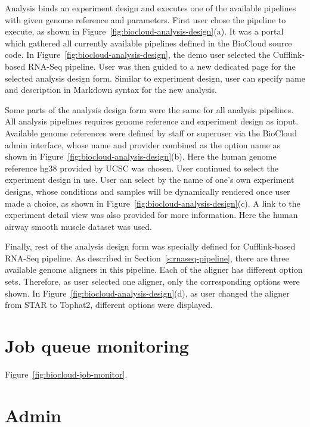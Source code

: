 

Analysis binds an experiment design and executes one of the available pipelines
with given genome reference and parameters. First user chose the pipeline to
execute, as shown in Figure~\ref{fig:biocloud-analysis-design}(a). It was a
portal which gathered all currently available pipelines defined in the BioCloud
source code. In Figure~\ref{fig:biocloud-analysis-design}, the demo user
selected the Cufflink-based RNA-Seq pipeline. User was then guided to a new
dedicated page for the selected analysis design form. Similar to experiment
design, user can specify name and description in Markdown syntax for the
new analysis.

Some parts of the analysis design form were the same for all analysis
pipelines. All analysis pipelines requires genome reference and experiment
design as input. Available genome references were defined by staff or superuser
via the BioCloud admin interface, whose name and provider combined as the
option name as shown in Figure~\ref{fig:biocloud-analysis-design}(b). Here the
human genome reference hg38 provided by UCSC was chosen. User continued to
select the experiment design in use. User can select by the name of one's own
experiment designs, whose conditions and samples will be dynamically rendered
once user made a choice, as shown in
Figure~\ref{fig:biocloud-analysis-design}(c). A link to the experiment detail
view was also provided for more information. Here the human airway smooth
muscle dataset was used.

Finally, rest of the analysis design form was specially defined for
Cufflink-based RNA-Seq pipeline. As described in
Section~\ref{s:rnaseq-pipeline}, there are three available genome aligners in
this pipeline. Each of the aligner has different option sets. Therefore, as
user selected one aligner, only the corresponding options were shown. In
Figure~\ref{fig:biocloud-analysis-design}(d), as user changed the aligner from
STAR to Tophat2, different options were displayed.



\section{Job queue monitoring}

Figure~\ref{fig:biocloud-job-monitor}.




\section{Admin}
\label{s:biocloud-admin}

